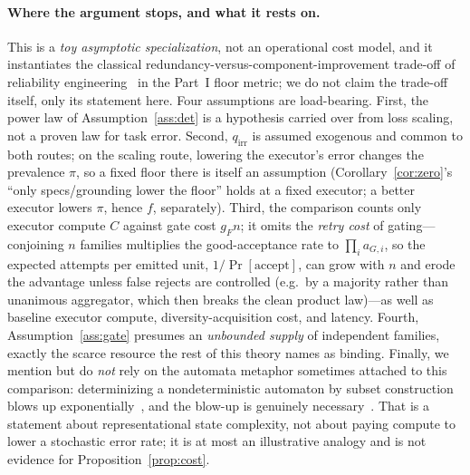 \documentclass[11pt]{article}
\theoremstyle{definition}
\theoremstyle{remark}
\newcommand{\fesc}{f}
\begin{document}
\paragraph{Where the argument stops, and what it rests on.}
This is a \emph{toy asymptotic specialization}, not an operational cost model, and it instantiates the
classical redundancy-versus-component-improvement trade-off of reliability engineering~\cite{kuo2000}
in the Part~I floor metric; we do not claim the trade-off itself, only its statement here. Four
assumptions are load-bearing. First, the power law of Assumption~\ref{ass:det} is a hypothesis carried
over from loss scaling, not a proven law for task error. Second, $q_{\mathrm{irr}}$ is assumed exogenous
and common to both routes; on the scaling route, lowering the executor's error changes the prevalence
$\pi$, so a fixed floor there is itself an assumption (Corollary~\ref{cor:zero}'s ``only specs/grounding
lower the floor'' holds at a fixed executor; a better executor lowers $\pi$, hence $\fesc$, separately).
Third, the comparison counts only executor compute $C$ against gate cost $g_F n$; it omits the
\emph{retry cost} of gating---conjoining $n$ families multiplies the good-acceptance rate to
$\prod_i a_{G,i}$, so the expected attempts per emitted unit, $1/\!\Pr[\text{accept}]$, can grow with
$n$ and erode the advantage unless false rejects are controlled (e.g.\ by a majority rather than
unanimous aggregator, which then breaks the clean product law)---as well as baseline executor compute,
diversity-acquisition cost, and latency. Fourth, Assumption~\ref{ass:gate} presumes an \emph{unbounded
supply} of independent families, exactly the scarce resource the rest of this theory names as binding.
Finally, we mention but do \emph{not} rely on the automata metaphor sometimes attached to this
comparison: determinizing a nondeterministic automaton by subset construction blows up
exponentially~\cite{rabinscott1959}, and the blow-up is genuinely necessary~\cite{meyerfischer1971}.
That is a statement about representational state complexity, not about paying compute to lower a
stochastic error rate; it is at most an illustrative analogy and is not evidence for
Proposition~\ref{prop:cost}.
\end{document}

